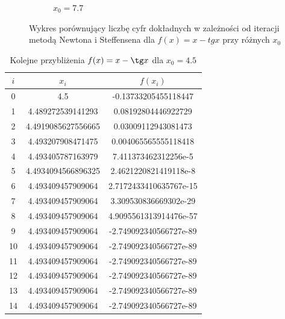 \documentclass{article}
\begin{document}
\begin{figure}[H]
\begin{subfigure}[b]{0.45\textwidth}
        \caption{$x_0=7.7$}
        \label{w3b}
    \end{subfigure}
    \caption{Wykres porównujący liczbę cyfr dokładnych w zależności od iteracji metodą Newtona i Steffensena dla $f(x)=x-tg x$ przy różnych $x_0$}
 	\label{w3}
\end{figure}
\begin{table}[p]
    \centering
    \begin{tabular}{|c|c|c|} 
    \hline
    	$i$ &$x_i$&$f(x_i)$\\\hline
0 & 4.5 & -0.13733205455118447 \\
1 & 4.489272539141293 & 0.08192804446922729 \\
2 & 4.4919085627556665 & 0.03009112943081473 \\
3 & 4.493207908471475 & 0.004065565555118418 \\
4 & 4.493405787163979 & 7.411373462312256e-5 \\
5 & 4.4934094566896325 & 2.4621220821419118e-8 \\
6 & 4.493409457909064 & 2.7172433410635767e-15 \\
7 & 4.493409457909064 & 3.309530836669302e-29 \\
8 & 4.493409457909064 & 4.9095561313914476e-57 \\
9 & 4.493409457909064 & -2.749092340566727e-89 \\
10 & 4.493409457909064 & -2.749092340566727e-89 \\
11 & 4.493409457909064 & -2.749092340566727e-89 \\
12 & 4.493409457909064 & -2.749092340566727e-89 \\
13 & 4.493409457909064 & -2.749092340566727e-89 \\
14 & 4.493409457909064 & -2.749092340566727e-89 \\
 		\hline
    \end{tabular}
    \caption{Kolejne przybliżenia $f(x)=x-\tg x$ dla $x_0=4.5$}
	\label{t2}
\end{table}
\end{document}
